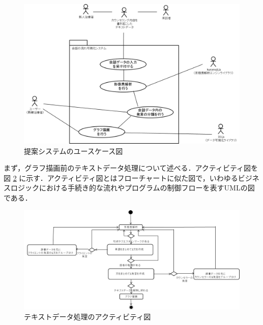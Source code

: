 \documentclass[shuuron]{kuee}
\begin{document}
\begin{figure}
  \begin{center}
    \includegraphics[width=\linewidth]{use_case_diagram.png}
  \end{center}
  \caption{提案システムのユースケース図}
  \label{fig:use_case_diagram}
\end{figure}


まず，グラフ描画前のテキストデータ処理について述べる．アクティビティ図を図
\ref{fig:activity}
に示す．アクティビティ図とはフローチャートに似た図で，いわゆるビジネスロジックにおける手続き的な流れやプログラムの制御フローを表すUMLの図である．
\begin{figure}
  \begin{center}
    \includegraphics[width=\linewidth]{activity.png}
  \end{center}
  \caption{テキストデータ処理のアクティビティ図}
  \label{fig:activity}
\end{figure}
\end{document}
